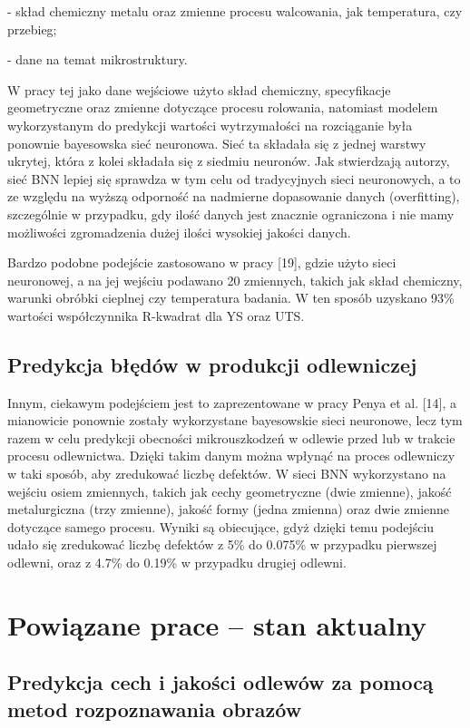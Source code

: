 - skład chemiczny metalu oraz zmienne procesu walcowania, jak temperatura, czy przebieg;

- dane na temat mikrostruktury. 

\noindent W pracy tej jako dane wejściowe użyto skład chemiczny, specyfikacje geometryczne oraz zmienne dotyczące procesu rolowania, natomiast modelem wykorzystanym do predykcji wartości wytrzymałości na rozciąganie była ponownie bayesowska sieć neuronowa. Sieć ta składała się z jednej warstwy ukrytej, która z kolei składała się z siedmiu neuronów. Jak stwierdzają autorzy, sieć BNN lepiej się sprawdza w tym celu od tradycyjnych sieci neuronowych, a to ze względu na wyższą odporność na nadmierne dopasowanie danych (overfitting), szczególnie w przypadku, gdy ilość danych jest znacznie ograniczona i nie mamy możliwości zgromadzenia dużej ilości wysokiej jakości danych.
    
Bardzo podobne podejście zastosowano w pracy [19], gdzie użyto sieci neuronowej, a na jej wejściu podawano 20 zmiennych, takich jak skład chemiczny, warunki obróbki cieplnej czy temperatura badania. W ten sposób uzyskano 93\% wartości współczynnika R-kwadrat dla YS oraz UTS.

\subsection{Predykcja błędów w produkcji odlewniczej}
\label{cha2.1.3}

Innym, ciekawym podejściem jest to zaprezentowane w pracy Penya et al. [14], a mianowicie ponownie zostały wykorzystane bayesowskie sieci neuronowe, lecz tym razem w celu predykcji obecności mikrouszkodzeń w odlewie przed lub w trakcie procesu odlewnictwa. Dzięki takim danym można wpłynąć na proces odlewniczy w taki sposób, aby zredukować liczbę defektów. W sieci BNN wykorzystano na wejściu osiem zmiennych, takich jak cechy geometryczne (dwie zmienne), jakość metalurgiczna (trzy zmienne), jakość formy (jedna zmienna) oraz dwie zmienne dotyczące samego procesu. Wyniki są obiecujące, gdyż dzięki temu podejściu udało się zredukować liczbę defektów z 5\% do 0.075\% w przypadku pierwszej odlewni, oraz z 4.7\% do 0.19\% w przypadku drugiej odlewni.

\section{Powiązane prace – stan aktualny}
\label{cha2.2}

\subsection{Predykcja cech i jakości odlewów za pomocą metod rozpoznawania obrazów}
\label{cha2.2.1}

